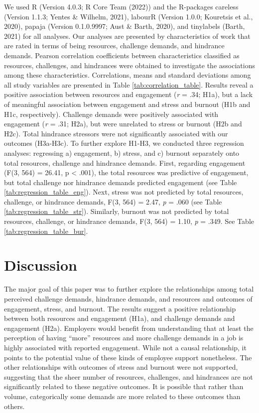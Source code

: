 \documentclass[
  man]{apa6}
\begin{document}
We used R (Version 4.0.3; R Core Team (2022)) and the R-packages careless (Version 1.1.3; Yentes \& Wilhelm, 2021), labourR (Version 1.0.0; Kouretsis et al., 2020), papaja (Version 0.1.0.9997; Aust \& Barth, 2020), and tinylabels (Barth, 2021) for all analyses. Our analyses are presented by characteristics of work that are rated in terms of being resources, challenge demands, and hindrance demands. Pearson correlation coefficients between characteristics classified as resources, challenges, and hindrances were obtained to investigate the associations among these characteristics.
Correlations, means and standard deviations among all study variables are presented in Table \ref{tab:correlation_table}. Results reveal a positive association between resources and engagement (\emph{r} = .34; H1a), but a lack of meaningful association between engagement and stress and burnout (H1b and H1c, respectively). Challenge demands were positively associated with engagement (\emph{r} = .31; H2a), but were unrelated to stress or burnout (H2b and H2c). Total hindrance stressors were not significantly associated with our outcomes (H3a-H3c). To further explore H1-H3, we conducted three regression analyses: regressing a) engagement, b) stress, and c) burnout separately onto total resources, challenge and hindrance demands. First, regarding engagement (F(3, 564) = 26.41, p \textless{} .001), the total resources was predictive of engagement, but total challenge nor hindrance demands predicted engagement (see Table \ref{tab:regression_table_eng}). Next, stress was not predicted by total resources, challenge, or hindrance demands, F(3, 564) = 2.47, \emph{p} = .060 (see Table \ref{tab:regression_table_str}). Similarly, burnout was not predicted by total resources, challenge, or hindrance demands, F(3, 564) = 1.10, \emph{p} = .349. See Table \ref{tab:regression_table_bur}.

\hypertarget{discussion}{%
\section{Discussion}\label{discussion}}

The major goal of this paper was to further explore the relationships among total perceived challenge demands, hindrance demands, and resources and outcomes of engagement, stress, and burnout. The results suggest a positive relationship between both resources and engagement (H1a), and challenge demands and engagement (H2a). Employers would benefit from understanding that at least the perception of having ``more'' resources and more challenge demands in a job is highly associated with reported engagement. While not a causal relationship, it points to the potential value of these kinds of employee support nonetheless. The other relationships with outcomes of stress and burnout were not supported, suggesting that the sheer number of resources, challenges, and hindrances are not significantly related to these negative outcomes. It is possible that rather than volume, categorically some demands are more related to these outcomes than others.
\end{document}
